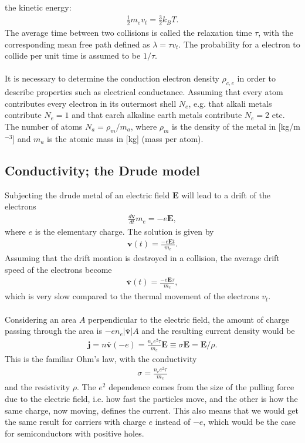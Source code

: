 the kinetic energy:
\begin{align}
   \frac{1}{2}m_e v_t = \frac{3}{2}k_B T.
\end{align}
The average time between two collisions is called the relaxation time $\tau$, with the 
corresponding mean free path defined as $\lambda  = \tau v_t$. The probability for a 
electron to collide per unit time is assumed to be $1/\tau$. 
\\
\\
It is necessary to determine the conduction electron density $\rho_{c,e}$ in order to describe
properties such as electrical conductance. Assuming that every atom contributes 
every electron in its outermost shell $N_e$, e.g. that alkali metals contribute $N_e = 1$ and 
that earch alkaline earth metals contribute $N_e = 2$ etc. The number of atoms $N_a = \rho_m /m_a$, 
where $\rho_m$ is the density of the metal in [kg/m$^{-3}$] and $m_a$ is the atomic mass in [kg] 
(mass per atom).

\subsection{Conductivity; the Drude model}
Subjecting the drude metal of an electric field $\boldsymbol E$ will lead to a drift of the electrons
\begin{align}
   \frac{d \boldsymbol v}{dt} m_e = -e \boldsymbol E ,
\end{align}
where $e$ is the elementary charge. The solution is given by
\begin{align}
   \boldsymbol v (t) = \frac{-e \boldsymbol E t}{m_e}.
\end{align}
Assuming that the drift montion is destroyed in a collision, the average drift speed 
of the electrons become
\begin{align}
   \bar{\boldsymbol v }(t) = \frac{-e \boldsymbol E \tau}{m_e},
\end{align}
which is very slow compared to the thermal movement of the electrons $v_t$.
\\
\\
Considering an area $A$ perpendicular to the electric field, the amount of charge passing through 
the area is $-e n_e | \bar{\boldsymbol v} | A $ and the resulting current density would be
\begin{align}
   \boldsymbol j = n  \bar{\boldsymbol v} (-e) = \frac{n_e e^2 \tau}{m_e} \boldsymbol E \equiv \sigma \boldsymbol E = \boldsymbol E / \rho.
\end{align}
This is the familiar Ohm's law, with the conductivity 
\begin{align}
\sigma = \frac{n_e e^2 \tau}{m_e}
\end{align}
and the resistivity $\rho$. The $e^2$ dependence comes from the size of the pulling force
due to the electric field, i.e. how fast the particles move, and the other is how the same
charge, now moving, defines the current. This also means that we would get the same 
result for carriers with charge $e$ instead of $-e$, which would be the case for semiconductors
with positive holes.

